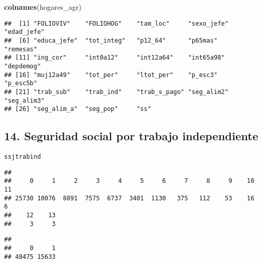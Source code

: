 \documentclass[11pt,]{article}
\newenvironment{Shaded}{\begin{snugshade}}{\end{snugshade}}
\newcommand{\KeywordTok}[1]{\textcolor[rgb]{0.13,0.29,0.53}{\textbf{#1}}}
\newcommand{\CommentTok}[1]{\textcolor[rgb]{0.56,0.35,0.01}{\textit{#1}}}
\newcommand{\OperatorTok}[1]{\textcolor[rgb]{0.81,0.36,0.00}{\textbf{#1}}}
\newcommand{\NormalTok}[1]{#1}
\begin{document}
\begin{Shaded}
\begin{Highlighting}[]
\KeywordTok{colnames}\NormalTok{(hogares_agr)}
\end{Highlighting}
\end{Shaded}

\begin{verbatim}
##  [1] "FOLIOVIV"    "FOLIOHOG"    "tam_loc"     "sexo_jefe"   "edad_jefe"  
##  [6] "educa_jefe"  "tot_integ"   "p12_64"      "p65mas"      "remesas"    
## [11] "ing_cor"     "int0a12"     "int12a64"    "int65a98"    "depdemog"   
## [16] "muj12a49"    "tot_per"     "ltot_per"    "p_esc3"      "p_esc5b"    
## [21] "trab_sub"    "trab_ind"    "trab_s_pago" "seg_alim2"   "seg_alim3"  
## [26] "seg_alim_a"  "seg_pop"     "ss"
\end{verbatim}

\subsection{14. Seguridad social por trabajo
independiente}\label{seguridad-social-por-trabajo-independiente}

\texttt{ssjtrabind}

\begin{Shaded}
\end{Shaded}

\begin{verbatim}
## 
##     0     1     2     3     4     5     6     7     8     9    10    11 
## 25730 10076  8891  7575  6737  3401  1130   375   112    53    16     6 
##    12    13 
##     3     3
\end{verbatim}

\begin{Shaded}
\end{Shaded}

\begin{verbatim}
## 
##     0     1 
## 48475 15633
\end{verbatim}
\end{document}
